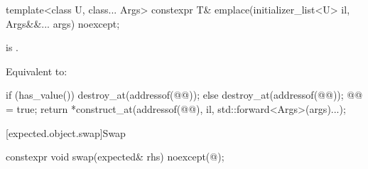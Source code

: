 %
\begin{itemdecl}
template<class U, class... Args>
  constexpr T& emplace(initializer_list<U> il, Args&&... args) noexcept;
\end{itemdecl}

\begin{itemdescr}
\pnum
\constraints
{}
is .

\pnum
\effects
Equivalent to:
\begin{codeblock}
if (has_value()) {
  destroy_at(addressof(@@));
} else {
  destroy_at(addressof(@@));
  @@ = true;
}
return *construct_at(addressof(@@), il, std::forward<Args>(args)...);
\end{codeblock}
\end{itemdescr}

[expected.object.swap]{Swap}

%
\begin{itemdecl}
constexpr void swap(expected& rhs) noexcept(@\seebelow@);
\end{itemdecl}

